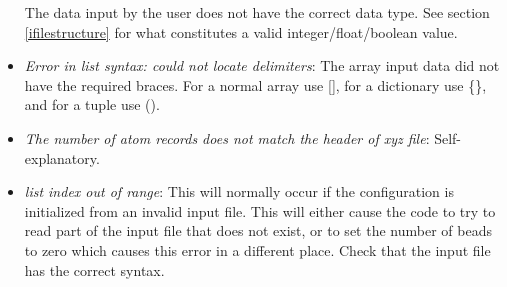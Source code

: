 \documentclass[11pt,english,fleqn]{report}
\begin{document}
\begin{itemize}
The data input by the user does not have the correct data type. See
section \ref{ifilestructure} for what constitutes a valid integer/float/boolean
value.
\item \emph{Error in list syntax: could not locate delimiters}: The array
input data did not have the required braces. For a normal array use
{[}{]}, for a dictionary use \{\}, and for a tuple use ().
\item \emph{The number of atom records does not match the header of xyz file}:
Self-explanatory.
\item \emph{list index out of range}: This will normally occur if the configuration
is initialized from an invalid input file. This will either cause
the code to try to read part of the input file that does not exist,
or to set the number of beads to zero which causes this error in a
different place. Check that the input file has the correct syntax.
\end{itemize}
\end{document}
